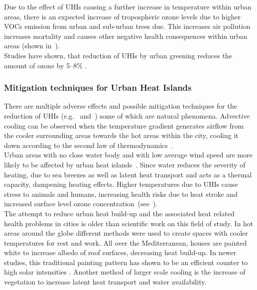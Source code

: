 \documentclass[12pt,a4paper, english,twoside]{scrartcl}
\begin{document}
      Due to the effect of \glspl{UHI} causing a further increase in temperature within urban areas, there is an expected increase of tropospheric ozone levels due to higher \glspl{VOC} emission from urban and sub-urban trees due. 
      This increases air pollution increases mortality and causes other negative health consequences within urban areas (shown in~\cite{Ebi2008}).\\ 
      Studies have shown, that reduction of \glspl{UHI} by urban greening reduces the amount of ozone by 5--8\% \autocite[p.209]{Fallmann2016}. 
    \subsubsection{Mitigation techniques for Urban Heat Islands}\label{ssec:mitigation}
      There are multiple adverse effects and possible mitigation techniques for the reduction of \glspl{UHI} (e.g.~\cite{Nichol1994} and~\cite{Stewart2011}) some of which are natural phenomena. %
      Advective cooling can be observed when the temperature gradient generates airflow from the cooler surrounding areas towards the hot areas within the city, cooling it down according to the second law of thermodynamics~\autocite{HaegerEugensson1999}. \\
      Urban areas with no close water body  and with low average wind speed are more likely to be affected by urban heat islands~\autocite{Ramamurthy2017}. 
      Since water reduces the severity of heating, due to sea breezes as well as latent heat transport and acts as a thermal capacity, dampening heating effects. 
      Higher temperatures due to \glspl{UHI} cause stress to animals and humans, increasing health risks due to heat stroke and increased surface level ozone concentration~(see~\cite{Santamouris2020}).\\
      The attempt to reduce urban heat build-up and the associated heat related health problems in cities is older than scientific work on this field of study. 
      In hot areas around the globe different methods were used to create spaces with cooler temperatures for rest and work. 
      All over the Mediterranean, houses are painted white to increase albedo of roof surfaces, decreasing heat build-up. 
      In newer studies, this traditional painting pattern has shown to be an efficient counter to high solar intensities \autocite{Fayad2021}.
      Another method of larger scale cooling is the increase of vegetation to increase latent heat transport and water availability.
\end{document}
